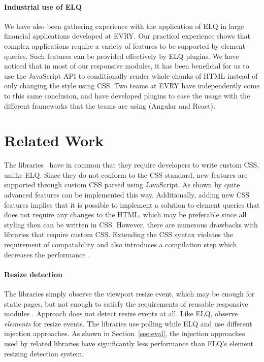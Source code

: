 \documentclass[sigconf,9pt]{acmart}
\newcommand{\elq}{ELQ}
\begin{document}
    \paragraph{Industrial use of \elq{}}
    We have also been gathering experience with the application of
    \elq{} in large financial applications developed at EVRY.
    Our practical experience shows that complex applications
    require a variety of features to be supported by element queries.
    Such features can be provided effectively by \elq{} plugins.
    We have noticed that in most of our responsive modules, it has been beneficial for us to use the JavaScript API
    to conditionally render whole chunks of HTML instead of only changing the style using CSS.
    Two teams at EVRY have independently come to this same conclusion, and have developed plugins to ease the usage with the different frameworks that the teams are using (Angular and React).

\section{Related Work}\label{sec:related}
  The libraries~\cite{eq_imp_magichtml,eq_imp_eqcss,eq_imp_prollyfill-min-width,eq_imp_localised-css,eq_imp_gss} have in common that they require developers to write custom CSS, unlike \elq{}.
  Since they do not conform to the CSS standard, new features are supported through custom CSS parsed using JavaScript.
  As shown by \cite{eq_imp_eqcss,eq_imp_gss} quite advanced features can be implemented this way.
  Additionally, adding new CSS features implies that it is possible to implement a solution to element queries that does not require any changes to the HTML, which may be preferable since all styling then can be written in CSS.
  However, there are numerous drawbacks with libraries that require custom CSS.
  Extending the CSS syntax violates the requirement of compatability and also introduces a compilation step which decreases the performance \cite{elq-thesis}.

  \paragraph{Resize detection}
  The libraries \cite{eq_imp_eqcss,eq_imp_breakpointsjs,eq_imp_mediaclass,eq_imp_elementquery,eq_imp_responsive-elements,eq_imp_sickles,eq_imp_responsive-elements-2,eq_imp_breaks2000,eq_imp_eqjs} simply observe the viewport resize event, which may be enough for static pages, but not enough to satisfy the requirements of reusable responsive modules \cite{elq-thesis}.
  Approach \cite{eq_imp_classquery} does not detect resize events at all.
  Like \elq{}, \cite{eq_imp_localised-css,eq_imp_selector_queries,eq_imp_prollyfill-min-width,eq_imp_gss,eq_imp_element-queries,eq_imp_css-element-queries} observe \emph{elements} for resize events.
  The libraries \cite{eq_imp_localised-css,eq_imp_selector_queries} use polling while \elq{} and \cite{eq_imp_prollyfill-min-width,eq_imp_gss,eq_imp_element-queries,eq_imp_css-element-queries} use different injection approaches.
  As shown in Section~\ref{sec:eval}, the injection approaches used by related libraries have significantly less performance than \elq{}'s element resizing detection system.
\end{document}
